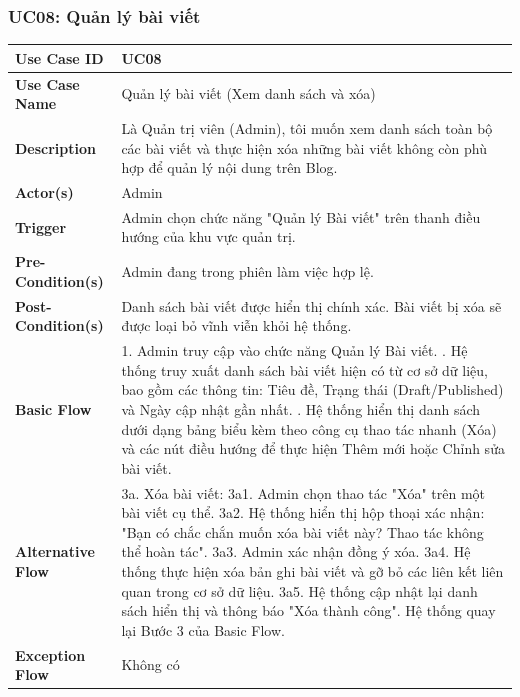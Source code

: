 \documentclass[a4paper,12pt]{article}
\begin{document}
\subsubsection{UC08: Quản lý bài viết}
\begin{longtable}{|p{4cm}|p{11.5cm}|}
\hline
\textbf{Use Case ID} & UC08 \\ \hline
\textbf{Use Case Name} & Quản lý bài viết (Xem danh sách và xóa) \\ \hline
\textbf{Description} & Là Quản trị viên (Admin), tôi muốn xem danh sách toàn bộ các bài viết và thực hiện xóa những bài viết không còn phù hợp để quản lý nội dung trên Blog. \\ \hline
\textbf{Actor(s)} & Admin \\ \hline
\textbf{Trigger} & Admin chọn chức năng "Quản lý Bài viết" trên thanh điều hướng của khu vực quản trị. \\ \hline
\textbf{Pre-Condition(s)} & Admin đang trong phiên làm việc hợp lệ. \\ \hline
\textbf{Post-Condition(s)} & Danh sách bài viết được hiển thị chính xác. Bài viết bị xóa sẽ được loại bỏ vĩnh viễn khỏi hệ thống. \\ \hline
\textbf{Basic Flow} & 
1. Admin truy cập vào chức năng Quản lý Bài viết. \newline
2. Hệ thống truy xuất danh sách bài viết hiện có từ cơ sở dữ liệu, bao gồm các thông tin: Tiêu đề, Trạng thái (Draft/Published) và Ngày cập nhật gần nhất. \newline
3. Hệ thống hiển thị danh sách dưới dạng bảng biểu kèm theo công cụ thao tác nhanh (Xóa) và các nút điều hướng để thực hiện Thêm mới hoặc Chỉnh sửa bài viết. \\ \hline
\textbf{Alternative Flow} & 
3a. Xóa bài viết: \newline
3a1. Admin chọn thao tác "Xóa" trên một bài viết cụ thể. \newline
3a2. Hệ thống hiển thị hộp thoại xác nhận: "Bạn có chắc chắn muốn xóa bài viết này? Thao tác không thể hoàn tác". \newline
3a3. Admin xác nhận đồng ý xóa. \newline
3a4. Hệ thống thực hiện xóa bản ghi bài viết và gỡ bỏ các liên kết liên quan trong cơ sở dữ liệu. \newline
3a5. Hệ thống cập nhật lại danh sách hiển thị và thông báo "Xóa thành công". \newline
Hệ thống quay lại Bước 3 của Basic Flow. \\ \hline
\textbf{Exception Flow} & 
Không có \\ \hline

\end{longtable}
\end{document}
